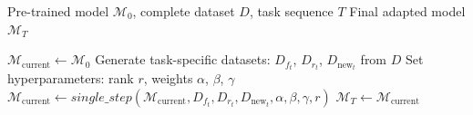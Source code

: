 \begin{algorithm}[htbp]
\caption{\textit{multi\_step()}}
\label{algo:multi_step}
\begin{algorithmic}[1]
\REQUIRE Pre-trained model $\mathcal{M}_0$, complete dataset $D$, task sequence $T$
\ENSURE Final adapted model $\mathcal{M}_T$

\STATE $\mathcal{M}_{\text{current}} \leftarrow \mathcal{M}_0$
    \STATE Generate task-specific datasets: $D_{f_t}$, $D_{r_t}$, $D_{\text{new}_t}$ from $D$
    \STATE Set hyperparameters: rank $r$, weights $\alpha$, $\beta$, $\gamma$
    \STATE $\mathcal{M}_{\text{current}} \leftarrow \textit{single\_step}(\mathcal{M}_{\text{current}}, D_{f_t}, D_{r_t}, D_{\text{new}_t}, \alpha, \beta, \gamma, r)$
\ENDFOR
\RETURN $\mathcal{M}_T \leftarrow \mathcal{M}_{\text{current}}$
\end{algorithmic}
\end{algorithm}